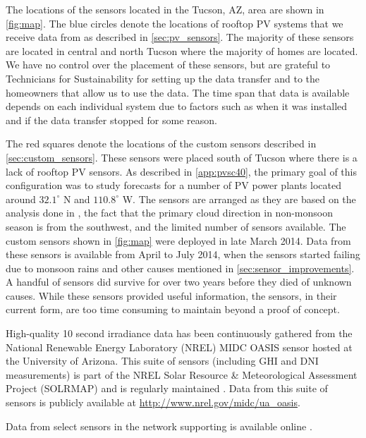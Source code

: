 The locations of the sensors located in the Tucson, AZ, area are shown
in \cref{fig:map}.
The blue circles denote the locations of rooftop PV systems that we
receive data from as described in \cref{sec:pv_sensors}.
The majority of these sensors are located in central and north Tucson
where the majority of homes are located.
We have no control over the placement of these sensors, but are
grateful to Technicians for Sustainability for setting up the data
transfer and to the homeowners that allow us to use the data.
The time span that data is available depends on each individual
system due to factors such as when it was installed and if the data
transfer stopped for some reason.

The red squares denote the locations of the custom sensors described
in \cref{sec:custom_sensors}.
These sensors were placed south of Tucson where there is a lack of
rooftop PV sensors.
As described in \cref{app:pvsc40}, the primary goal of this
configuration was to study forecasts for a number of PV power plants
located around $32.1^\circ$ N and $110.8^\circ$ W.
The sensors are arranged as they are based on the analysis done in
\cite{Lonij2013}, the fact that the primary cloud direction in
non-monsoon season is from the southwest, and the limited number of
sensors available.
The custom sensors shown in \cref{fig:map} were deployed in late March
2014.
Data from these sensors is available from April to July 2014, when the
sensors started failing due to monsoon rains and other causes
mentioned in \cref{sec:sensor_improvements}.
A handful of sensors did survive for over two years before they died
of unknown causes.
While these sensors provided useful information, the sensors, in their
current form, are too time consuming to maintain beyond a proof of
concept.

High-quality 10 second irradiance data has been continuously gathered
from the National Renewable Energy Laboratory (NREL) MIDC OASIS sensor
hosted at the University of Arizona.
This suite of sensors (including GHI and DNI measurements) is part of
the NREL Solar Resource \& Meteorological Assessment Project (SOLRMAP)
and is regularly maintained \citep{Wilcox_Andreas_2010}.
Data from this suite of sensors is publicly available at
\url{http://www.nrel.gov/midc/ua_oasis}.

Data from select sensors in the network supporting
\cite{Lorenzo2015c,Lorenzo2017} is available online
\citep{Lorenzo2015b,Lorenzo2016b}.



